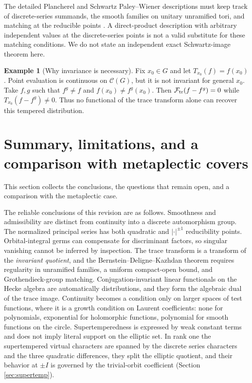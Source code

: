 \documentclass[12pt,letterpaper]{amsart}
\numberwithin{equation}{section}
\theoremstyle{definition}
\newtheorem{example}[theorem]{Example}
\theoremstyle{remark}
\newcommand{\calC}{\mathcal C}
\begin{document}
The detailed Plancherel and Schwartz Paley--Wiener descriptions must keep track of discrete-series summands, the smooth families on unitary unramified tori, and matching at the reducible points \cite{Cl91,Si79}.  A direct-product description with arbitrary independent values at the discrete-series points is not a valid substitute for these matching conditions. We do not state an independent exact Schwartz-image theorem here.

\begin{example}[Why invariance is necessary]
Fix $x_0\in G$ and let $T_{x_0}(f)=f(x_0)$. Point evaluation is continuous on $\calC(G)$, but it is not invariant for general $x_0$. Take $f,g$ such that $f^g\ne f$ and $f(x_0)\ne f^g(x_0)$. Then $\mathcal F_{\rm tr}(f-f^g)=0$ while $T_{x_0}(f-f^g)\ne0$. Thus no functional of the trace transform alone can recover this tempered distribution.
\end{example}








\section{Summary, limitations, and a comparison with metaplectic covers}\label{sec:summary}
This section collects the conclusions, the questions that remain open, and a comparison with the metaplectic case.

The reliable conclusions of this revision are as follows.  Smoothness and admissibility are distinct from continuity into a discrete automorphism group.  The normalized principal series has both quadratic and $|\cdot|^{\pm1}$ reducibility points.  Orbital-integral germs can compensate for discriminant factors, so singular vanishing cannot be inferred by inspection.  The trace transform is a transform of the \emph{invariant quotient}, and the Bernstein--Deligne--Kazhdan theorem requires regularity in unramified families, a uniform compact-open bound, and Grothendieck-group matching.  Conjugation-invariant linear functionals on the Hecke algebra are automatically distributions, and they form the algebraic dual of the trace image. Continuity becomes a condition only on larger spaces of test functions, where it is a growth condition on Laurent coefficients: none for polynomials, exponential for holomorphic functions, polynomial for smooth functions on the circle.  Supertemperedness is expressed by weak constant terms and does not imply literal support on the elliptic set. In rank one the supertempered virtual characters are spanned by the discrete series characters and the three quadratic differences, they split the elliptic quotient, and their behavior at $\pm I$ is governed by the trivial-orbit coefficient (Section \ref{sec:supertemp}).
\end{document}
